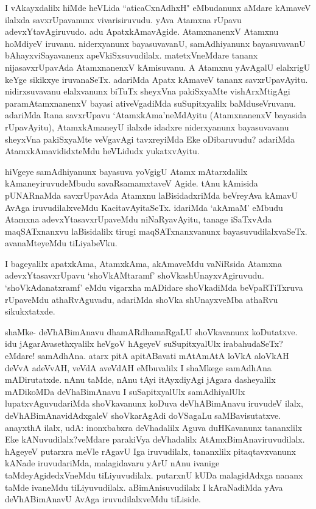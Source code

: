 
\begin{artha}
I vAkayxdalilx hiMde heVLida ``aticaCxnAdhxH" eMbudanunx aMdare kAmaveV ilalxda savxrUpavanunx vivarisiruvudu. yAva Atamxna rUpavu adevxYtavAgiruvudo. adu ApatxkAmavAgide. AtamxnanenxV Atamxnu hoMdiyeV iruvanu. niderxyanunx bayasuvavanU, samAdhiyanunx bayasuvavanU bAhayxviSayavanenx apeVkiSxsuvudilalx. matetxVneMdare tananx nijasavxrUpavAda AtamxnanenxV kAmisuvanu. A Atamxnu yAvAgalU elalxrigU keYge sikikxye iruvanaSeTx. adariMda Apatx kAmaveV tananx savxrUpavAyitu. nidirxsuvavanu elalxvanunx biTuTx sheyxVna pakiSxyaMte vishArxMtigAgi paramAtamxnanenxV bayasi ativeVgadiMda suSupitxyalilx baMduseVruvanu. adariMda Itana savxrUpavu `AtamxkAma'neMdAyitu (AtamxnanenxV bayasida rUpavAyitu), AtamxkAmaneyU ilalxde idadxre niderxyanunx bayasuvavanu sheyxVna pakiSxyaMte veVgavAgi tavxreyiMda Eke oDibaruvudu? adariMda AtamxkAmavididxteMdu heVLidudx yukatxvAyitu. 
\end{artha}%

\begin{artha}
hiVgeye samAdhiyanunx bayasuva yoVgigU Atamx mAtarxdalilx kAmaneyiruvudeMbudu savaRsamamxtaveV Agide. tAnu kAmisida pUNARnaMda savxrUpavAda Atamxnu laBisidadxriMda beVreyAva kAmavU AvAga iruvudilalxveMdu KacitavAyitaSeTx. idariMda `akAmaM' eMbudu Atamxna adevxYtasavxrUpaveMdu niNaRyavAyitu, tanage iSaTxvAda maqSATxnanxvu laBisidalilx tirugi maqSATxnanxvanunx bayasuvudilalxvaSeTx. avanaMteyeMdu tiLiyabeVku.
\end{artha}

\begin{artha}
I bageyalilx apatxkAma, AtamxkAma, akAmaveMdu vaNiRsida Atamxna adevxYtasavxrUpavu `shoVkAMtaramf' shoVkashUnayxvAgiruvudu. `shoVkAdanatxramf' eMdu vigarxha mADidare shoVkadiMda beVpaRTiTxruva rUpaveMdu athaRvAguvadu, adariMda shoVka shUnayxveMba athaRvu sikukxtatxde. 
\end{artha}

\begin{artha}
shaMke- deVhABimAnavu dhamARdhamaRgaLU shoVkavanunx koDutatxve. idu jAgarAvasethxyalilx heVgoV hAgeyeV suSupitxyalUlx irabahudaSeTx? eMdare! samAdhAna. atarx pitA apitABavati mAtA\s mAtA loVkA aloVkAH deVvA adeVvAH, veVdA aveVdAH eMbuvalilx I shaMkege samAdhAna mADirutatxde. nAnu taMde, nAnu tAyi itAyxdiyAgi jAgara dasheyalilx mADikoMDa deVhaBimAnavu I suSapitxyalUlx samAdhiyalUlx lupatxvAguvudariMda shoVkavanunx koDuva deVhABimAnavu iruvudeV ilalx, deVhABimAnavidAdxgaleV shoVkarAgAdi doVSagaLu saMBavisutatxve. anayxthA ilalx, udA: inonxbabxra deVhadalilx Aguva duHKavanunx tananxlilx Eke kANuvudilalx?veMdare parakiVya deVhadalilx AtAmxBimAnaviruvudilalx. hAgeyeV putarxra meVle rAgavU Iga iruvudilalx, tananxlilx pitaqtavxvanunx kANade iruvudariMda, malagidavaru yArU nAnu ivanige taMdeyAgidedxVneMdu tiLiyuvudilalx. putarxnU kUDa malagidAdxga nananx taMde ivaneMdu tiLiyuvudilalx. aBimAnisuvudilalx I kAraNadiMda yAva deVhABimAnavU AvAga iruvudilalxveMdu tiLiside.
\end{artha}%

